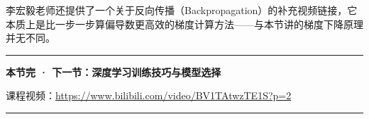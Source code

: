 \documentclass[a4paper]{article}
\newcommand{\videourl}{https://www.bilibili.com/video/BV1TAtwzTE1S?p=2}
\begin{document}
李宏毅老师还提供了一个关于反向传播（Backpropagation）的补充视频链接，它本质上是比一步一步算偏导数更高效的梯度计算方法——与本节讲的梯度下降原理并无不同。

\vspace{1cm}

\begin{center}
    \rule{0.5\textwidth}{0.5pt}
    \vspace{0.3cm}

    \textbf{本节完 · 下一节：深度学习训练技巧与模型选择}

    课程视频：\href{\videourl}{\videourl}

    \vspace{0.3cm}
    \rule{0.5\textwidth}{0.5pt}
\end{center}
\end{document}
